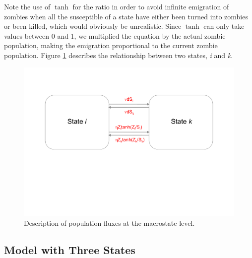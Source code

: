 \documentclass[11pt]{article} %
\begin{document}
Note the use of $\tanh$ for the ratio in order to avoid infinite emigration of zombies when all the susceptible of a state have either been turned into zombies or been killed, which would obviously be unrealistic. Since $\tanh$ can only take values between 0 and 1, we multiplied the equation by the actual zombie population, making the emigration proportional to the current zombie population. Figure \ref{macrostate} describes the relationship between two states, \textit{i} and \textit{k}.


\begin{figure}[h!]
\centerline{
\includegraphics[scale=0.45]{../images/Powerpoint_figures/macrostate.pdf}}
\caption{Description of population fluxes at the macrostate level.
\label{macrostate} }
\end{figure}



\subsection{Model with Three States}\indent
\end{document}

